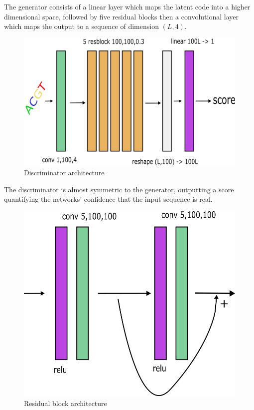 \documentclass[11pt]{article}
\begin{document}
The generator consists of a linear layer which maps the latent code into 
a higher dimensional space, followed by five residual blocks then a convolutional layer which maps the output to a sequence of dimension  $(L, 4)$.

\begin{figure}
    \includegraphics{discriminator.png}
    \caption{Discriminator architecture}
\end{figure}

The discriminator is almost symmetric to the generator, outputting a score 
quantifying the networks' confidence that the input sequence is real.

\begin{figure}
    \includegraphics{resblock.png}
    \caption{Residual block architecture}
\end{figure}
\end{document}
